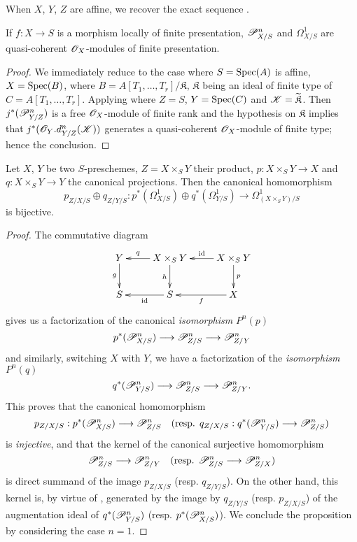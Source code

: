When $X$, $Y$, $Z$ are affine, we recover the exact sequence .

\begin{corollary}[16.4.22]
\label{IV.16.4.22}
If $f: X \to S$ is a morphism locally of finite presentation, $\mathscr{P}_{X/S}^n$ and $\Omega_{X/S}^1$ are quasi-coherent $\mathscr{O}_X$-modules of finite presentation.
\end{corollary}

\begin{proof}
We immediately reduce to the case where $S = \operatorname{Spec}(A)$ is affine, $X = \operatorname{Spec}(B)$, where $B = A[T_1, \dots, T_r]/\mathfrak{K}$, $\mathfrak{K}$ being an ideal of finite type of $C = A[T_1, \dots, T_r]$.
Applying  where $Z = S$, $Y = \operatorname{Spec}(C)$ and $\mathscr{K} = \widetilde{\mathfrak{K}}$.
Then $j^*(\mathscr{P}_{Y/Z}^n)$ is a free $\mathscr{O}_X$-module of finite rank  and the hypothesis on $\mathfrak{K}$ implies that $j^*(\mathscr{O}_Y.d_{Y/Z}^n(\mathscr{K}))$ generates a quasi-coherent $\mathscr{O}_X$-module of finite type;
hence the conclusion.
\end{proof}

\begin{proposition}[16.4.23]
\label{IV.16.4.23}
Let $X$, $Y$ be two $S$-preschemes, $Z = X \times_S Y$ their product, $p:X \times_S Y \to X$ and $q:X \times_S Y \to Y$ the canonical projections.
Then the canonical homomorphism
\[
  \label{IV.16.4.23.1}
  p_{Z/X/S} \oplus q_{Z/Y/S}: p^*(\Omega_{X/S}^1) \oplus  q^*(\Omega_{Y/S}^1) \to \Omega_{(X\times_S Y)/S}^1
  \tag{16.4.23.1}
\]
is bijective.
\end{proposition}   

\begin{proof}
The commutative diagram
\[
  \xymatrix{
    Y \ar[d]_-g & X \times_S Y \ar[l]_-q \ar[d]_-h & X \times_S Y \ar[l]_-{\operatorname{id}} \ar[d]^-p\\
    S & S \ar[l]^-{\operatorname{id}} & X \ar[l]^-f
  }
\]
gives us a factorization of the canonical \emph{isomorphism} $P^n(p)$ 
\[
  p^*(\sh{P}_{X/S}^n) \to \sh{P}_{Z/S}^n \to \sh{P}_{Z/Y}^n
\]
and similarly, switching $X$ with $Y$, we have a factorization of the \emph{isomorphism} $P^n(q)$
\[
  q^*(\sh{P}_{Y/S}^n) \to \sh{P}_{Z/S}^n \to \sh{P}_{Z/Y}^n.
\]
This proves that the canonical homomorphism 
\[
  p_{Z/X/S}:p^*(\sh{P}_{X/S}^n) \to \sh{P}_{Z/S}^n \quad \text{(resp. $q_{Z/X/S}:q^*(\sh{P}_{Y/S}^n) \to \sh{P}_{Z/S}^n$)}
\] 
is \emph{injective}, and that the kernel of the canonical surjective homomorphism  
\[
  \sh{P}_{Z/S}^n \to \sh{P}_{Z/Y}^n \quad \text{(resp. $\sh{P}_{Z/S}^n \to \sh{P}_{Z/X}^n$)}
\] 
is direct summand of the image $p_{Z/X/S}$ (resp. $q_{Z/Y/S}$).
On the other hand, this kernel is, by virtue of , generated by the image by $q_{Z/Y/S}$ (resp. $p_{Z/X/S}$) of the augmentation ideal of $q^*(\mathscr{P}_{Y/S}^n)$ (resp. $p^*(\mathscr{P}_{X/S}^n)$).
We conclude the proposition by considering the case $n = 1$.
\end{proof}

